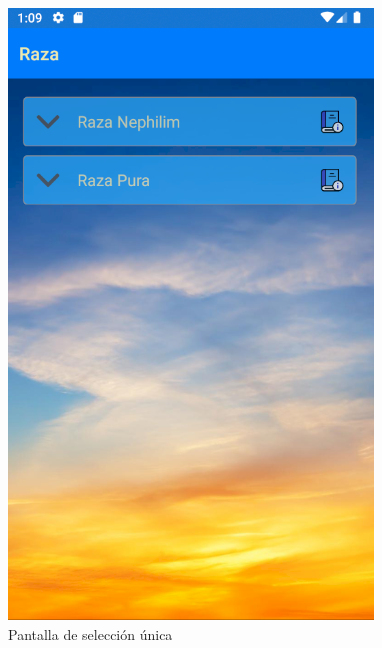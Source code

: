 \begin{figure}[H]
    \centering
    \includegraphics[scale=0.3]{Figures/Capturas/SeleccionUnicaGrupoCerrado.png}
    \caption{Pantalla de selección única}
    \label{SeleccionUnicaGrupoCerrado}    
\end{figure}
